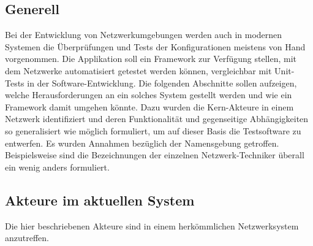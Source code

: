 \documentclass[
	ngerman,
	toc=listof, %
	toc=bibliography, %
	footnotes=multiple, %
	parskip=half, %
	numbers=noendperiod %
]{scrartcl}
\begin{document}
	\subsection{Generell}
		Bei der Entwicklung von Netzwerkumgebungen werden auch in modernen Systemen die Überprüfungen und Tests der Konfigurationen meistens von Hand vorgenommen.
		Die Applikation soll ein Framework zur Verfügung stellen, mit dem Netzwerke automatisiert getestet werden können, vergleichbar mit Unit-Tests in der Software-Entwicklung.
		Die folgenden Abschnitte sollen aufzeigen, welche Herausforderungen an ein solches System gestellt werden und wie ein Framework damit umgehen könnte.
		Dazu wurden die Kern-Akteure in einem Netzwerk identifiziert und deren Funktionalität und gegenseitige Abhängigkeiten so generalisiert wie möglich formuliert, um auf dieser Basis die Testsoftware zu entwerfen.
		Es wurden Annahmen bezüglich der Namensgebung getroffen. Beispielsweise sind die Bezeichnungen der einzelnen Netzwerk-Techniker überall ein wenig anders formuliert.
		\newpage

	\subsection{Akteure im aktuellen System}
	\label{sec:Akteure}
	Die hier beschriebenen Akteure sind in einem herkömmlichen Netzwerksystem anzutreffen. 
	
\end{document}
